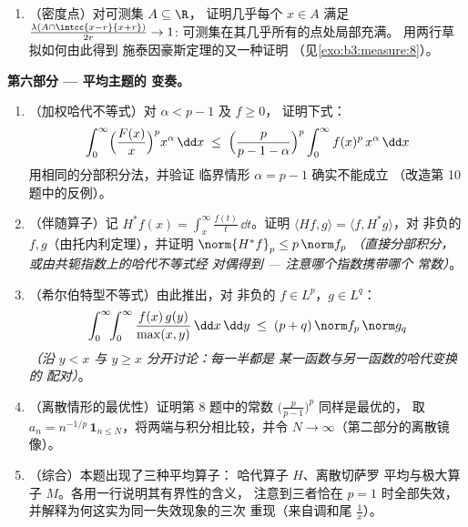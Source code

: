 \begin{problem}
\begin{enumerate}[resume]
{        点}（相对于 $f$）；(b) 对 $f \in L^1$，原函数
        $F(x) = \int_0^xf$ 几乎处处可导，且 $F' =
        f$ 几乎处处成立 --- 勒贝格意义下的微积分
        基本定理的积分部分，闭合了
        由阶梯函数开启的循环，
        （见\cref{pb:b3:measure:1}），表明其逆向部分
        可以不成立。
  \item （密度点）对可测集 $A \subseteq \R$，
        证明几乎每个 $x \in A$ 满足
        $\frac{\lambda(A\cap\intcc{x-r}{x+r})}{2r} \to 1$:
        可测集在其几乎所有的点处局部充满。
        用两行草拟如何由此得到
        施泰因豪斯定理的又一种证明
        （见\cref{exo:b3:measure:8}）。
\end{enumerate}

\medskip
\noindent\textbf{第六部分 --- 平均主题的
变奏。}
\begin{enumerate}[resume]
  \item （加权哈代不等式）对 $\alpha < p - 1$ 及 $f \geq 0$，
        证明下式：
        \[
        \int_0^\infty\Bigl(\frac{F(x)}x\Bigr)^{p}
        x^{\alpha}\,\dd x \;\leq\;
        \Bigl(\frac{p}{p - 1 - \alpha}\Bigr)^{p}
        \int_0^\infty f(x)^p\,x^{\alpha}\,\dd x
        \]
        用相同的分部积分法，并验证
        临界情形 $\alpha = p - 1$ 确实不能成立
        （改造第 10 题中的反例）。
  \item （伴随算子）记 $H^*f(x) =
        \int_x^{\infty}\frac{f(t)}t\,\dd t$。证明 $\langle
        Hf, g\rangle = \langle f, H^*g\rangle$，对
        非负的 $f, g$（由托内利定理），并证明
        $\norm{H^*f}_p \leq p\,\norm f_p$ \emph{（直接分部积分，
        或由共轭指数上的哈代不等式经
        对偶得到 --- 注意哪个指数携带哪个
        常数）}。
  \item （希尔伯特型不等式）由此推出，对
        非负的 $f \in L^p$，$g \in L^q$：
        \[
        \int_0^\infty\!\!\int_0^\infty
        \frac{f(x)\,g(y)}{\max(x,y)}\,\dd x\,\dd y
        \;\leq\; (p + q)\,\norm f_p\,\norm g_q
        \]
        \emph{（沿 $y < x$ 与 $y \geq x$ 分开讨论：每一半都是
        某一函数与另一函数的哈代变换的
        配对）}。
  \item （离散情形的最优性）证明第 8 题中的常数
        $\bigl(\frac p{p-1}\bigr)^p$ 同样是最优的，
        取 $a_n = n^{-1/p}\,\mathbf 1_{n \leq
        N}$，将两端与积分相比较，并令 $N
        \to \infty$（第二部分的离散镜像）。
  \item （综合）本题出现了三种平均算子：
        哈代算子 $H$、离散切萨罗
        平均与极大算子 $M$。各用一行说明其有界性的含义，
        注意到三者恰在 $p = 1$ 时全部失效，
        并解释为何这实为同一失效现象的三次
        重现（来自调和尾
        $\frac1x$）。
\end{enumerate}


\end{problem}

